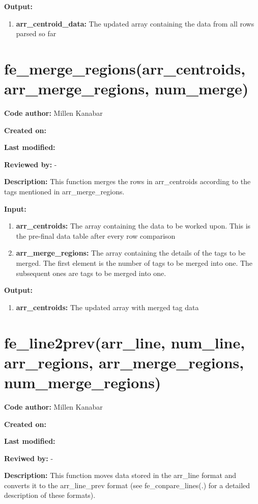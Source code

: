 \documentclass[a4paper, oneside,11pt]{article}
\begin{document}
\textbf{Output:}
\begin{enumerate}
    \item \textbf{arr\_centroid\_data:} The updated array containing the data from all rows parsed so far
\end{enumerate}

\section*{fe\_merge\_regions(arr\_centroids, arr\_merge\_regions, num\_merge)}
\textbf{Code author:} Millen Kanabar


\textbf{Created on:}


\textbf{Last modified:}


\textbf{Reviewed by:} -

\textbf{Description:}
    This function merges the rows in arr\_centroids according to the tags mentioned in arr\_merge\_regions.
    
\textbf{Input:}
\begin{enumerate}
    \item \textbf{arr\_centroids:} The array containing the data to be worked upon. This is the pre-final data table after every row comparison
    \item \textbf{arr\_merge\_regions:} The array containing the details of the tags to be merged. The first element is the number of tags to be merged into one. The subsequent ones are tags to be merged into one.
\end{enumerate}

\textbf{Output:}
\begin{enumerate}
    \item \textbf{arr\_centroids:} The updated array with merged tag data
\end{enumerate}

\newpage

\section*{fe\_line2prev(arr\_line, num\_line, arr\_regions, arr\_merge\_regions, \\ num\_merge\_regions)}
\textbf{Code author:} Millen Kanabar


\textbf{Created on:}


\textbf{Last modified:}


\textbf{Reviwed by:} -

\textbf{Description:}
    This function moves data stored in the arr\_line format and converts it to the arr\_line\_prev format (see fe\_conpare\_lines(.) for a detailed description of these formats).
    
\end{document}
